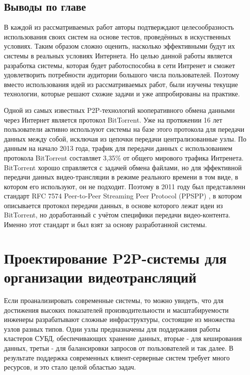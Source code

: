 	\subsection{Выводы по главе}

	В каждой из рассматриваемых работ авторы подтверждают целесообразность использования своих систем на основе
	тестов, проведённых в искуственных условиях. Таким образом сложно оценить, насколько эффективными будут
	их системы в реальных условиях Интернета. Но целью данной работы является разработка системы, которая будет
	работоспособна в сети Интренет и сможет удовлетворить потребности аудитории большого числа пользователей.
	Поэтому вместо использования идей из рассматриваемых работ, были изучены текущие технологии, которые решают
	схожие задачи и уже аппробированы на практике.

	Одной из самых известных P2P-технологий кооперативного обмена данными через Интернет является протокол
	BitTorrent. Уже на протяжении 16 лет пользователи активно используют системы на базе этого протокола для
	передачи данных между собой, исключая из цепочки передачи централизованные узлы. По данным на начало 2013 года,
	трафик для передачи данных с использованием протокола BitTorrent составляет 3,35\% от общего мирового трафика
	Интренета. BitTorrent хорошо справляется с задачей обмена файлами, но для эффективной передачи данных
	видео-трансляции в режиме реального времени в том виде, в котором его используют, он не подходит. Поэтому в 2011
	году был представленн стандарт RFC 7574 Peer-to-Peer Streaming Peer Protocol (PPSPP) \cite{rfc7574} , в котором описывается
	протокол передачи данных, в основе которого лежат идеи из BitTorrent, но доработанный с учётом специфики передачи
	видео-контента. Именно этот стандарт и был взят за основу разработанной системы.

\section{Проектирование P2P-системы для организации видеотрансляций}
	Если проанализировать современные системы, то можно увидеть, что для достижения высоких показателей
	производительности и масштабируемости инженеры разрабатывают сложные инфраструктуры, состоящие из множества
	узлов разных типов. Одни узлы предназначены для поддержания работы кластеров СУБД, обеспечивающих хранение данных,
	вторые - для кеширования данных, третьи - для балансировки запросов от пользователей и так далее. В результате
	поддержка современных клиент-серверные систем требует много ресурсов, и это стало целой областью задач.

